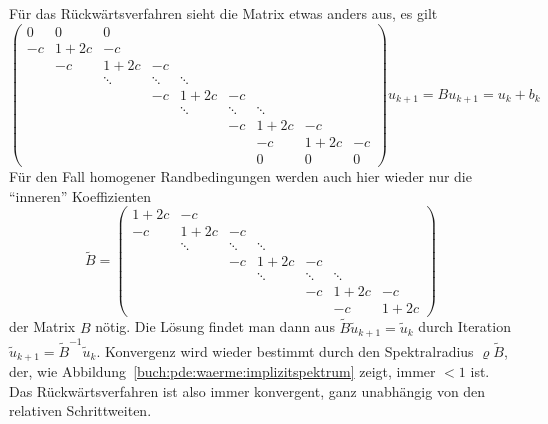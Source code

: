 Für das Rückwärtsverfahren sieht die Matrix etwas anders aus, es gilt
\begin{equation}
\begin{pmatrix}
   0  &    0  &   0  &      &      &      &      &      &      \\
  -c  &  1+2c &  -c  &      &      &      &      &      &      \\
      &   -c  & 1+2c &  -c  &      &      &      &      &      \\
      &       &\ddots&\ddots&\ddots&      &      &      &      \\
      &       &      &  -c  & 1+2c &  -c  &      &      &      \\
      &       &      &      &\ddots&\ddots&\ddots&      &      \\
      &       &      &      &      &  -c  & 1+2c &  -c  &      \\
      &       &      &      &      &      &  -c  & 1+2c &  -c  \\
      &       &      &      &      &      &   0  &   0  &   0  
\end{pmatrix}
u_{k+1}
=
Bu_{k+1}
=
u_k + b_k
\end{equation}
Für den Fall homogener Randbedingungen werden auch hier wieder
nur die ``inneren'' Koeffizienten
\[
\tilde{B}
=
\begin{pmatrix}
 1+2c &  -c  &      &      &      &      &      \\
  -c  & 1+2c &  -c  &      &      &      &      \\
      &\ddots&\ddots&\ddots&      &      &      \\
      &      &  -c  & 1+2c &  -c  &      &      \\
      &      &      &\ddots&\ddots&\ddots&      \\
      &      &      &      &  -c  & 1+2c &  -c  \\
      &      &      &      &      &  -c  & 1+2c 
\end{pmatrix}
\]
der Matrix $B$ nötig.
Die Lösung findet man dann aus $\tilde{B}\tilde{u}_{k+1}=\tilde{u}_k$
durch Iteration $\tilde{u}_{k+1}=\tilde{B}^{-1} \tilde{u}_k$.
Konvergenz wird wieder bestimmt durch den Spektralradius $\varrho{\tilde{B}}$,
der, wie Abbildung~\ref{buch:pde:waerme:implizitspektrum} zeigt, immer
$<1$ ist.
Das Rückwärtsverfahren ist also immer konvergent, ganz unabhängig von
den relativen Schrittweiten.

